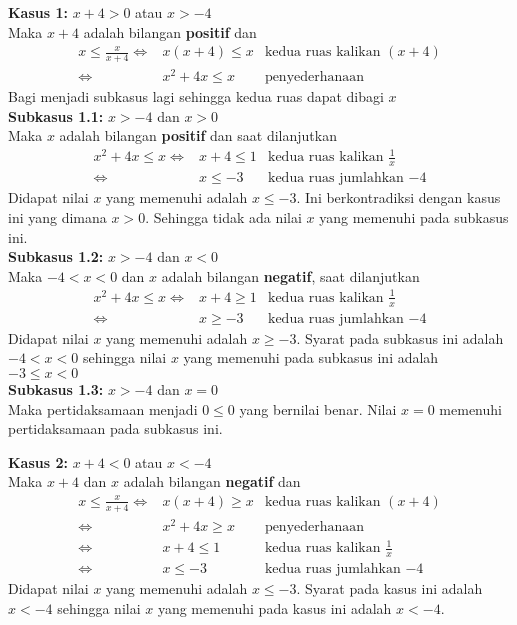 \begin{enumerate}[leftmargin=*, label={\arabic*}.]
\begin{enumerate}[label={\alph*}.]
    \textbf{Kasus 1: }$x+4 > 0$ atau $x>-4$\\
    Maka $x+4$ adalah bilangan \textbf{positif} dan
    \begin{align*}
        x \leq \frac{x}{x+4}
        \iff &x(x+4) \leq x
        &\text{kedua ruas kalikan $(x+4)$}\\
        \iff &x^{2}+4x \leq x
        &\text{penyederhanaan}
    \end{align*}
    Bagi menjadi subkasus lagi sehingga kedua ruas dapat dibagi $x$\\
    \textbf{Subkasus 1.1: }$x>-4$ dan $x>0$\\
    Maka $x$ adalah bilangan \textbf{positif} dan saat dilanjutkan
    \begin{align*}
        x^{2}+4x \leq x
        \iff &x+4 \leq 1
        &\text{kedua ruas kalikan $\frac{1}{x}$}\\
        \iff &x \leq -3
        &\text{kedua ruas jumlahkan $-4$}
    \end{align*}
    Didapat nilai $x$ yang memenuhi adalah $x\leq -3$. Ini berkontradiksi dengan
    kasus ini yang dimana $x > 0$. Sehingga tidak ada nilai $x$ yang memenuhi
    pada subkasus ini. \\
    \textbf{Subkasus 1.2: }$x>-4$ dan $x<0$\\
    Maka $-4 < x < 0$ dan $x$ adalah bilangan \textbf{negatif}, saat dilanjutkan
    \begin{align*}
        x^{2}+4x \leq x
        \iff &x+4 \geq 1
        &\text{kedua ruas kalikan $\frac{1}{x}$}\\
        \iff &x \geq -3
        &\text{kedua ruas jumlahkan $-4$}
    \end{align*}
    Didapat nilai $x$ yang memenuhi adalah $x \geq -3$. Syarat pada subkasus
    ini adalah $-4 < x < 0$ sehingga nilai $x$ yang memenuhi pada subkasus ini
    adalah $-3 \leq x < 0$ \\
    \textbf{Subkasus 1.3: }$x>-4$ dan $x=0$\\
    Maka pertidaksamaan menjadi $0 \leq 0$ yang bernilai benar. Nilai $x=0$
    memenuhi pertidaksamaan pada subkasus ini.

    \textbf{Kasus 2: }$x+4 < 0$ atau $x < -4$\\
    Maka $x+4$ dan $x$ adalah bilangan \textbf{negatif} dan
    \begin{align*}
        x \leq \frac{x}{x+4}
        \iff &x(x+4) \geq x
        &\text{kedua ruas kalikan $(x+4)$}\\
        \iff &x^{2}+4x \geq x
        &\text{penyederhanaan}\\
        \iff &x+4 \leq 1
        &\text{kedua ruas kalikan $\frac{1}{x}$}\\
        \iff &x \leq -3
        &\text{kedua ruas jumlahkan $-4$}
    \end{align*}
    Didapat nilai $x$ yang memenuhi adalah $x \leq -3$. Syarat pada kasus
    ini adalah $x < -4$ sehingga nilai $x$ yang memenuhi pada kasus ini
    adalah $x < -4$.
        

\end{enumerate}
\end{enumerate}
